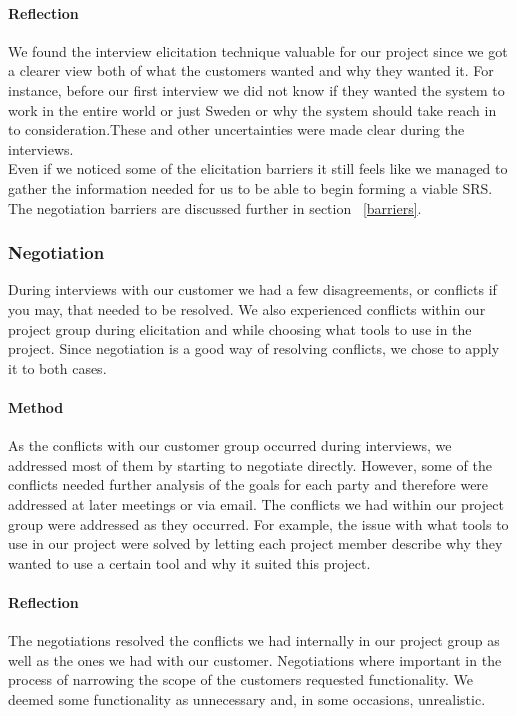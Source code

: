 \documentclass[10pt]{article}
\begin{document}
\paragraph{Reflection}
\hfill \break
We found the interview elicitation technique valuable for our project since we got a clearer view both of what the customers wanted and why they wanted it. For instance, before our first interview we did not know  if they wanted the system to work in the entire world or just Sweden or why the system should take reach in to consideration.These and other uncertainties were made clear during the interviews. \\
\indent Even if we noticed some of the elicitation barriers it still feels like we managed to gather the information needed for us to be able to begin forming a viable SRS. The negotiation barriers are discussed further in section ~\ref{barriers}.

\subsubsection{Negotiation}
During interviews with our customer we had a few disagreements, or conflicts if you may, that needed to be resolved. We also experienced conflicts within our project group during elicitation and while choosing what tools to use in the project. Since negotiation is a good way of resolving conflicts, we chose to apply it to both cases.

\paragraph{Method}
\hfill \break
As the conflicts with our customer group occurred during interviews, we addressed most of them by starting to negotiate directly. However, some of the conflicts needed further analysis of the goals for each party and therefore were addressed at later meetings or via email. The conflicts we had within our project group were addressed as they occurred. For example, the issue with what tools to use in our project were solved by letting each project member describe why they wanted to use a certain tool and why it suited this project. 

\paragraph{Reflection}
\hfill \break
The negotiations resolved the conflicts we had internally in our project group as well as the ones we had with our customer. Negotiations where important in the process of narrowing the scope of the customers requested functionality. We deemed some functionality as unnecessary and, in some occasions, unrealistic.
\end{document}
